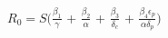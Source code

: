 \documentclass[preview]{standalone}
\begin{document}
\begin{center}
$R_0 = $$S ($$\frac{\beta_1}{\gamma} $ + $\frac{\beta_2}{\alpha}$ + $\frac{\beta_3}{\delta_c}$ + $\frac{\beta_4 \epsilon_p}{\alpha \delta_p}$$)$
\end{center}
\end{document}

